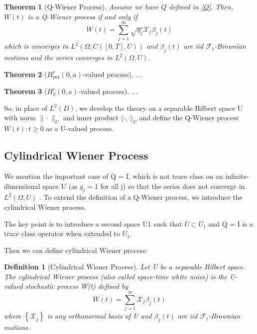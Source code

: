 \documentclass{article}
\newtheorem{theorem}{Theorem}
\newtheorem{definition}{Definition}
\begin{document}
\begin{theorem}[Q-Wiener Process]
    Assume we have $Q$ defined in \ref{Q}. Then, $W(t)$ is a Q-Wiener process if and only if 
    \begin{equation}
        W(t)=\sum_{j=1}^\infty \sqrt{q_j}\mathcal{X}_j\beta_j(t)
    \end{equation}
    which is converges in $L^2\left(\Omega, C([0, T], U)\right)$ and $\beta_j(t)$ are iid $\mathcal{F}_t$-Brownian motions and the series converges in $L^2(\Omega,U)$.
\end{theorem}


\begin{theorem}[$H_{\operatorname{per}}^r(0, a)$-valued process]
    ...
\end{theorem}

\begin{theorem}[$H_0^r(0, a)$-valued process]
    ...
\end{theorem}

So, in place of $L^2(D)$, we develop the theory on a separable Hilbert space U with norm $\|\cdot\|_U$ and inner product $\langle \cdot, \cdot\rangle _U$ and define the Q-Wiener process ${W (t) : t \geq 0}$ as a U-valued process. 

\subsection{Cylindrical Wiener Process}

We mention the important case of Q = I, which is not trace class on an infinite-dimensional space U (as $q_j = 1$ for all j) so that the series does not converge in $L^2(\Omega,U)$ . To extend the definition of a Q-Wiener process, we introduce the cylindrical Wiener process.

The key point is to introduce a second space U1 such that $U\subset U_1$ and Q = I is a trace class operator when extended to $U_1$. 

Then we can define cylindrical Wiener process:  
\begin{definition}[Cylindrical Wiener Process]
Let  U  be a separable Hilbert space. The cylindrical Wiener process (also called space-time white noise) is the  U-valued stochastic process  W(t)  defined by
$$W(t)=\sum_{j=1}^{\infty} \mathcal{X}_{j} \beta_{j}(t)$$
where  $\left\{\mathcal{X}_{j}\right\}$  is any orthonormal basis of  U  and  $\beta_{j}(t)$  are iid  $\mathcal{F}_{t}$-Brownian motions. 
\end{definition}
\end{document}
